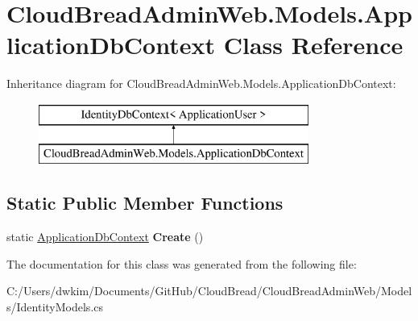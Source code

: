 \hypertarget{a00016}{}\section{Cloud\+Bread\+Admin\+Web.\+Models.\+Application\+Db\+Context Class Reference}
\label{a00016}
Inheritance diagram for Cloud\+Bread\+Admin\+Web.\+Models.\+Application\+Db\+Context\+:\begin{figure}[H]
\begin{center}
\leavevmode
\includegraphics[height=2.000000cm]{a00016}
\end{center}
\end{figure}
\subsection*{Static Public Member Functions}
\begin{DoxyCompactItemize}
\item 
static \hyperlink{a00016}{Application\+Db\+Context} {\bfseries Create} ()\hypertarget{a00016_ae838c6a49ec5da37448d58c0b7ea9fed}{}\label{a00016_ae838c6a49ec5da37448d58c0b7ea9fed}

\end{DoxyCompactItemize}


The documentation for this class was generated from the following file\+:\begin{DoxyCompactItemize}
\item 
C\+:/\+Users/dwkim/\+Documents/\+Git\+Hub/\+Cloud\+Bread/\+Cloud\+Bread\+Admin\+Web/\+Models/Identity\+Models.\+cs\end{DoxyCompactItemize}
